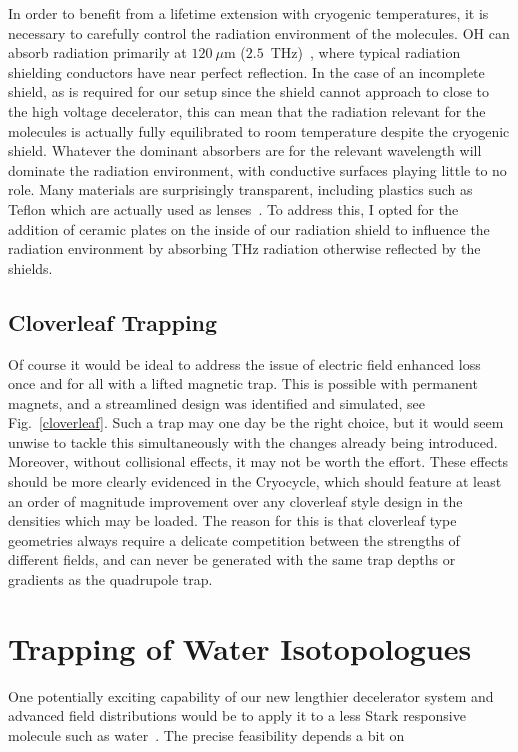 \documentclass[defaultstyle,11pt]{thesis}
\begin{document}
In order to benefit from a lifetime extension with cryogenic temperatures, it is necessary to carefully control the radiation environment of the molecules. OH can absorb radiation primarily at $120~\mu$m ($2.5$~THz)~\cite{Hoekstra2007}, where typical radiation shielding conductors have near perfect reflection.
In the case of an incomplete shield, as is required for our setup since the shield cannot approach to close to the high voltage decelerator, this can mean that the radiation relevant for the molecules is actually fully equilibrated to room temperature despite the cryogenic shield.
Whatever the dominant absorbers are for the relevant wavelength will dominate the radiation environment, with conductive surfaces playing little to no role.
Many materials are surprisingly transparent, including plastics such as Teflon which are actually used as lenses~\cite{}.
To address this, I opted for the addition of ceramic plates on the inside of our radiation shield to influence the radiation environment by absorbing THz radiation otherwise reflected by the shields.

\subsection{Cloverleaf Trapping}

Of course it would be ideal to address the issue of electric field enhanced loss once and for all with a lifted magnetic trap.
This is possible with permanent magnets, and a streamlined design was identified and simulated, see Fig.~\ref{cloverleaf}.
Such a trap may one day be the right choice, but it would seem unwise to tackle this simultaneously with the changes already being introduced.
Moreover, without collisional effects, it may not be worth the effort.
These effects should be more clearly evidenced in the Cryocycle, which should feature at least an order of magnitude improvement over any cloverleaf style design in the densities which may be loaded.
The reason for this is that cloverleaf type geometries always require a delicate competition between the strengths of different fields, and can never be generated with the same trap depths or gradients as the quadrupole trap.

\section{Trapping of Water Isotopologues}

One potentially exciting capability of our new lengthier decelerator system and advanced field distributions would be to apply it to a less Stark responsive molecule such as water~\citep[Sec.~2.4]{VanDeMeerakker2006thesis}.
The precise feasibility depends a bit on 


\end{document}
